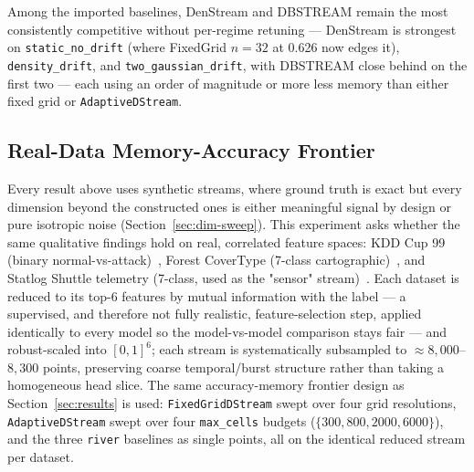 \documentclass[11pt]{article}
\begin{document}
Among the imported baselines, DenStream and DBSTREAM remain the most consistently competitive without per-regime retuning — DenStream is strongest on \texttt{static\_no\_drift} (where FixedGrid $n{=}32$ at 0.626 now edges it), \texttt{density\_drift}, and \texttt{two\_gaussian\_drift}, with DBSTREAM close behind on the first two — each using an order of magnitude or more less memory than either fixed grid or \texttt{AdaptiveDStream}.

\subsection{Real-Data Memory-Accuracy Frontier}
\label{sec:real-data}

Every result above uses synthetic streams, where ground truth is exact but every dimension beyond the constructed ones is either meaningful signal by design or pure isotropic noise (Section~\ref{sec:dim-sweep}). This experiment asks whether the same qualitative findings hold on real, correlated feature spaces: KDD Cup 99 (binary normal-vs-attack)~\cite{KDDCup1999}, Forest CoverType (7-class cartographic)~\cite{Blackard1999Covtype}, and Statlog Shuttle telemetry (7-class, used as the "sensor" stream)~\cite{Zhu2010StreamData}. Each dataset is reduced to its top-6 features by mutual information with the label — a supervised, and therefore not fully realistic, feature-selection step, applied identically to every model so the model-vs-model comparison stays fair — and robust-scaled into $[0,1]^6$; each stream is systematically subsampled to $\approx 8{,}000$--$8{,}300$ points, preserving coarse temporal/burst structure rather than taking a homogeneous head slice. The same accuracy-memory frontier design as Section~\ref{sec:results} is used: \texttt{FixedGridDStream} swept over four grid resolutions, \texttt{AdaptiveDStream} swept over four \texttt{max\_cells} budgets ($\{300, 800, 2000, 6000\}$), and the three \texttt{river} baselines as single points, all on the identical reduced stream per dataset.
\end{document}
